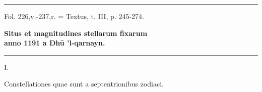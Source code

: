 \documentclass[11pt]{article}
\begin{document}
\clearpage
\noindent{}\par\vspace{-1mm}\noindent\rule{\textwidth}{.4pt}\par\vspace{2mm}
\begin{center}{\small Fol. 226,v.-237,r. = Textus, t. III, p. 245-274.}\end{center}
\begin{center}{\large\bfseries Situs et magnitudines stellarum fixarum\\anno 1191 a Dhū ’l-qarnayn.}\end{center}
\begin{center}\rule{30mm}{.4pt}\end{center}
\begin{center}I.\end{center}
\begin{center}Constellationes quae sunt a septentrionibus zodiaci.\end{center}
\end{document}
